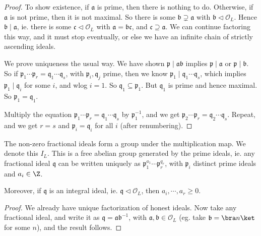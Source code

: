 \documentclass[a4paper]{article}
\begin{document}
\begin{proof}
  To show existence, if $\mathfrak{a}$ is prime, then there is nothing to do. Otherwise, if $\mathfrak{a}$ is not prime, then it is not maximal. So there is some $\mathfrak{b} \supsetneq \mathfrak{a}$ with $\mathfrak{b} \lhd \mathcal{O}_L$. Hence $\mathfrak{b} \mid \mathfrak{a}$, ie. there is some $\mathfrak{c} \lhd \mathcal{O}_L$ with $\mathfrak{a} = \mathfrak{b} \mathfrak{c}$, and $\mathfrak{c} \supseteq \mathfrak{a}$. We can continue factoring this way, and it must stop eventually, or else we have an infinite chain of strictly ascending ideals.

  We prove uniqueness the usual way. We have shown $\mathfrak{p} \mid \mathfrak{a}\mathfrak{b}$ implies $\mathfrak{p} \mid \mathfrak{a}$ or $\mathfrak{p} \mid \mathfrak{b}$. So if $\mathfrak{p}_1 \cdots \mathfrak{p}_r = \mathfrak{q}_1 \cdots \mathfrak{q}_s$, with $\mathfrak{p}_i, \mathfrak{q}_j$ prime, then we know $\mathfrak{p}_1 \mid \mathfrak{q}_1 \cdots \mathfrak{q}_s$, which implies $\mathfrak{p}_1 \mid \mathfrak{q}_i$ for some $i$, and wlog $i = 1$. So $\mathfrak{q}_1 \subseteq \mathfrak{p}_1$. But $\mathfrak{q}_1$ is prime and hence maximal. So $\mathfrak{p}_1 = \mathfrak{q}_1$.

  Multiply the equation $\mathfrak{p}_1 \cdots \mathfrak{p}_r = \mathfrak{q}_1 \cdots \mathfrak{q}_s$ by $\mathfrak{p}_1^{-1}$, and we get $\mathfrak{p}_2 \cdots \mathfrak{p}_r = \mathfrak{q}_2 \cdots \mathfrak{q}_s$. Repeat, and we get $r = s$ and $\mathfrak{p}_i = \mathfrak{q}_i$ for all $i$ (after renumbering).
\end{proof}

\begin{cor}
  The non-zero fractional ideals form a group under the multiplication map. We denote this $I_L$. This is a free abelian group generated by the prime ideals, ie. any fractional ideal $\mathfrak{q}$ can be written uniquely as $\mathfrak{p}_1^{a_1} \cdots \mathfrak{p}_r^{q_r}$, with $\mathfrak{p}_i$ distinct prime ideals and $a_i \in \Z$.

  Moreover, if $\mathfrak{q}$ is an integral ideal, ie. $\mathfrak{q} \lhd \mathcal{O}_L$, then $a_i, \cdots, a_r \geq 0$.
\end{cor}

\begin{proof}
  We already have unique factorization of honest ideals. Now take any fractional ideal, and write it as $\mathfrak{q} = \mathfrak{a} \mathfrak{b}^{-1}$, with $\mathfrak{a}, \mathfrak{b} \in \mathcal{O}_L$ (eg. take $\mathfrak{b} = \bra n\ket$ for some $n$), and the result follows.
\end{proof}
\end{document}
